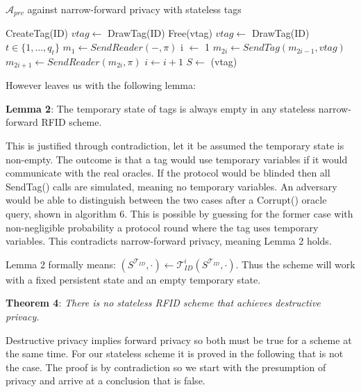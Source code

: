     \begin{algorithm}[H]
        \centering
        \caption{$\mathcal{A}_{prv}$ against narrow-forward privacy with stateless tags}
        \begin{algorithmic}[1] %
            \State CreateTag(ID)
            \State $vtag \leftarrow$ DrawTag(ID)
            \State Free(vtag)  
            \State $vtag \leftarrow$ DrawTag(ID)
            \State $t \in \{1, ..., q_t\}$
            \State $m_1 \leftarrow SendReader(-,\pi)$ 
            \State i $\leftarrow$ 1
                \State $m_{2i} \gets SendTag(m_{2i-1}, vtag)$ 
                \State $m_{2i+1} \gets SendReader(m_{2i}, \pi)$
                \State $i \gets i+1$
            \EndWhile
            \State $S \gets$ (vtag)
                \State {}
            \EndIf
        \end{algorithmic}
    \end{algorithm}

    However \cite{Impossibility_results} leaves us with the following lemma:

    \textbf{Lemma 2}: The temporary state of tags is always empty in any stateless narrow-forward RFID scheme. 

    This is justified through contradiction, let it be assumed the temporary state is non-empty. The outcome is that a tag would use temporary 
    variables if it would communicate with the real oracles. If the protocol would be blinded then all SendTag() calls are simulated, 
    meaning no temporary variables. An adversary would be able to distinguish between the two cases after a Corrupt() oracle query, 
    shown in algorithm 6. This is possible by guessing for the former case with non-negligible probability a protocol round where the
    tag uses temporary variables. This contradicts narrow-forward privacy, meaning Lemma 2 holds.

    Lemma 2 formally means: $(S^{\mathcal{T}_{ID}}, \cdot) \gets \mathcal{T}_{ID}^i(S^{\mathcal{T}_{ID}}, \cdot)$. Thus the scheme will 
    work with a fixed persistent state and an empty temporary state.
    
    \textbf{Theorem 4}: \textit{There is no stateless RFID scheme that achieves destructive privacy.}
    
    Destructive privacy implies forward privacy so both must be true for a scheme at the same time. For our stateless scheme it is proved in the following
    that is not the case. The proof is by contradiction so we start with the presumption of privacy and arrive at a conclusion that is false.

